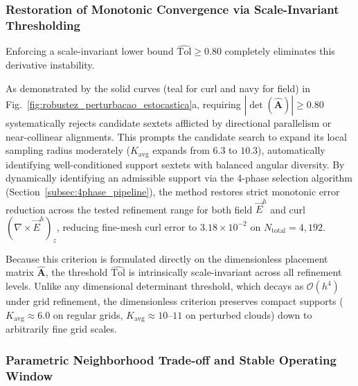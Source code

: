 \documentclass[preprint,12pt]{elsarticle}
\begin{document}
\subsubsection{Restoration of Monotonic Convergence via Scale-Invariant Thresholding}
\label{subsubsec:restoration_via_thresholding}

Enforcing a scale-invariant lower bound $\widehat{\mathrm{Tol}} \ge 0.80$ completely eliminates this derivative instability.

As demonstrated by the solid curves (teal for curl and navy for field) in Fig.~\ref{fig:robustez_perturbacao_estocastica}a, requiring $|\det(\widehat{\mathbf{A}})| \ge 0.80$ systematically rejects candidate sextets afflicted by directional parallelism or near-collinear alignments. This prompts the candidate search to expand its local sampling radius moderately ($K_{\mathrm{avg}}$ expands from $6.3$ to $10.3$), automatically identifying well-conditioned support sextets with balanced angular diversity. By dynamically identifying an admissible support via the 4-phase selection algorithm (Section~\ref{subsec:4phase_pipeline}), the method restores strict monotonic error reduction across the tested refinement range for both field $\vec{E}^h$ and curl $(\nabla \times \vec{E}^h)_z$, reducing fine-mesh curl error to $3.18 \times 10^{-2}$ on $N_{\mathrm{total}} = 4{,}192$.

Because this criterion is formulated directly on the dimensionless placement matrix $\widehat{\mathbf{A}}$, the threshold $\widehat{\mathrm{Tol}}$ is intrinsically scale-invariant across all refinement levels. Unlike any dimensional determinant threshold, which decays as $\mathcal{O}(h^4)$ under grid refinement, the dimensionless criterion preserves compact supports ($K_{\mathrm{avg}} \approx 6.0$ on regular grids, $K_{\mathrm{avg}} \approx 10\text{--}11$ on perturbed clouds) down to arbitrarily fine grid scales.

\subsubsection{Parametric Neighborhood Trade-off and Stable Operating Window}
\label{subsubsec:parametric_tradeoff}
\end{document}
